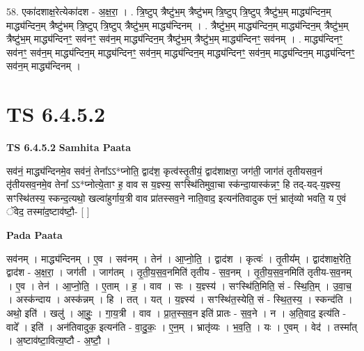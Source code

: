 \documentclass[17pt]{extarticle}
\begin{document}
58. एका॑दशाक्ष॒रेत्येका॑दश - अ॒क्ष॒रा॒ । . त्रि॒ष्टुप् त्रैष्टु॑भ॒म् त्रैष्टु॑भम् त्रि॒ष्टुप् त्रि॒ष्टुप् त्रैष्टु॑भ॒म् माद्ध्य॑न्दिन॒म् माद्ध्य॑न्दिन॒म् त्रैष्टु॑भम् त्रि॒ष्टुप् त्रि॒ष्टुप् त्रैष्टु॑भ॒म् माद्ध्य॑न्दिनम् । . त्रैष्टु॑भ॒म् माद्ध्य॑न्दिन॒म् माद्ध्य॑न्दिन॒म् त्रैष्टु॑भ॒म् त्रैष्टु॑भ॒म् माद्ध्य॑न्दिनꣳ॒॒ सव॑नꣳ॒॒ सव॑न॒म् माद्ध्य॑न्दिन॒म् त्रैष्टु॑भ॒म् त्रैष्टु॑भ॒म् माद्ध्य॑न्दिनꣳ॒॒ सव॑नम् । . माद्ध्य॑न्दिनꣳ॒॒ सव॑नꣳ॒॒ सव॑न॒म् माद्ध्य॑न्दिन॒म् माद्ध्य॑न्दिनꣳ॒॒ सव॑न॒म् माद्ध्य॑न्दिन॒म् माद्ध्य॑न्दिनꣳ॒॒ सव॑न॒म् माद्ध्य॑न्दिन॒म् माद्ध्य॑न्दिनꣳ॒॒ सव॑न॒म् माद्ध्य॑न्दिनम् । \newline
\pagebreak
{}

\section{ TS 6.4.5.2 }

\textbf{TS 6.4.5.2 } \newline
\textbf{Samhita Paata} \newline

सव॑नं॒ माद्ध्य॑न्दिनमे॒व सव॑नं॒ तेना᳚ऽऽ*प्नोति॒ द्वाद॑श॒ कृत्व॑स्तृ॒तीयं॒ द्वाद॑शाक्षरा॒ जग॑ती॒ जाग॑तं तृतीयसव॒नं तृ॑तीयसव॒नमे॒व तेना᳚ ऽऽ*प्नोत्ये॒ताꣳ ह॒ वाव स य॒ज्ञ्स्य॒ सꣳस्थि॑तिमुवा॒चा स्क॑न्दा॒यास्क॑न्नꣳ॒॒ हि तद्-यद्-य॒ज्ञ्स्य॒ सꣳस्थि॑तस्य॒ स्कन्द॒त्यथो॒ खल्वा॑हुर्गाय॒त्री वाव प्रा॑तस्सव॒ने नाति॒वाद॒ इत्यन॑तिवादुक एनं॒ भ्रातृ॑व्यो भवति॒ य ए॒वं ॅवेद॒ तस्मा॑द॒ष्टाव॑ष्टौ॒- [  ] \newline

\textbf{Pada Paata} \newline

सव॑नम् । माद्ध्य॑न्दिनम् । ए॒व । सव॑नम् । तेन॑ । आ॒प्नो॒ति॒ । द्वाद॑श । कृत्वः॑ । तृ॒तीय᳚म् । द्वाद॑शाक्ष॒रेति॒ द्वाद॑श - अ॒क्ष॒रा॒ । जग॑ती । जाग॑तम् । तृ॒ती॒य॒स॒व॒नमिति॑ तृतीय - स॒व॒नम् । तृ॒ती॒य॒स॒व॒नमिति॑ तृतीय-स॒व॒नम् । ए॒व । तेन॑ । आ॒प्नो॒ति॒ । ए॒ताम् । ह॒ । वाव । सः । य॒ज्ञ्स्य॑ । सꣳस्थि॑ति॒मिति॒ सं - स्थि॒ति॒म् । उ॒वा॒च॒ । अस्क॑न्दाय । अस्क॑न्नम् । हि । तत् । यत् । य॒ज्ञ्स्य॑ । सꣳस्थि॑त॒स्येति॒ सं - स्थि॒त॒स्य॒ । स्कन्द॑ति । अथो॒ इति॑ । खलु॑ । आ॒हुः॒ । गा॒य॒त्री । वाव । प्रा॒त॒स्स॒व॒न इति॑ प्रातः - स॒व॒ने । न । अ॒ति॒वाद॒ इत्य॑ति - वादे᳚ । इति॑ । अन॑तिवादुक॒ इत्यन॑ति - वा॒दु॒कः॒ । ए॒न॒म् । भ्रातृ॑व्यः । भ॒व॒ति॒ । यः । ए॒वम् । वेद॑ । तस्मा᳚त् । अ॒ष्टाव॑ष्टा॒वित्य॒ष्टौ - अ॒ष्टौ॒ ।  \newline
\end{document}
